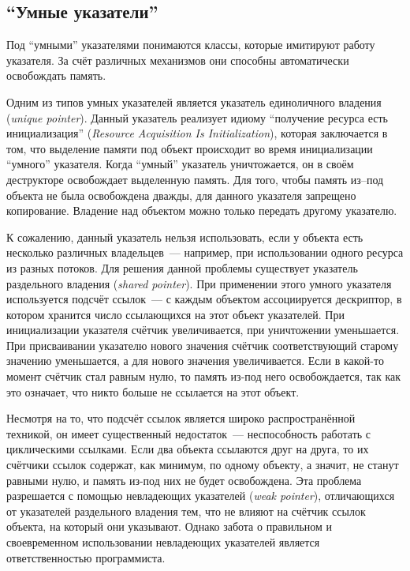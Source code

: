 \subsection{``Умные указатели''}
Под ``умными'' указателями понимаются классы, которые имитируют работу указателя. За счёт различных механизмов они способны автоматически освобождать память.

Одним из типов умных указателей является указатель единоличного владения (\textit{unique pointer}). Данный указатель реализует идиому ``получение ресурса есть инициализация'' (\textit{Resource Acquisition Is Initialization}), которая заключается в том, что выделение памяти под объект происходит во время инициализации ``умного'' указателя. Когда ``умный'' указатель уничтожается, он в своём деструкторе освобождает выделенную память. Для того, чтобы память из--под объекта не была освобождена дважды, для данного указателя запрещено копирование. Владение над объектом можно только передать другому указателю.

К сожалению, данный указатель нельзя использовать, если у объекта есть несколько различных владельцев~--- например, при использовании одного ресурса из разных потоков. Для решения данной проблемы существует указатель раздельного владения (\textit{shared pointer}). 
При применении этого умного указателя используется подсчёт ссылок~--- с каждым объектом ассоциируется дескриптор, в котором хранится число ссылающихся на этот объект указателей. При инициализации указателя счётчик увеличивается, при уничтожении уменьшается. При присваивании указателю нового значения счётчик соответствующий старому значению уменьшается, а для нового значения увеличивается. Если в какой-то момент счётчик стал равным нулю, то память из-под него освобождается, так как это означает, что никто больше не ссылается на этот объект.

Несмотря на то, что подсчёт ссылок является широко распространённой техникой, он имеет существенный недостаток~--- неспособность работать с циклическими ссылками. Если два объекта ссылаются друг на друга, то их счётчики ссылок содержат, как минимум, по одному объекту, а значит, не станут равными нулю, и память из-под них не будет освобождена. Эта проблема разрешается с помощью невладеющих указателей (\textit{weak pointer}), отличающихся от указателей раздельного владения тем, что не влияют на счётчик ссылок объекта, на который  они указывают. Однако забота о правильном и своевременном использовании невладеющих указателей является ответственностью программиста.

